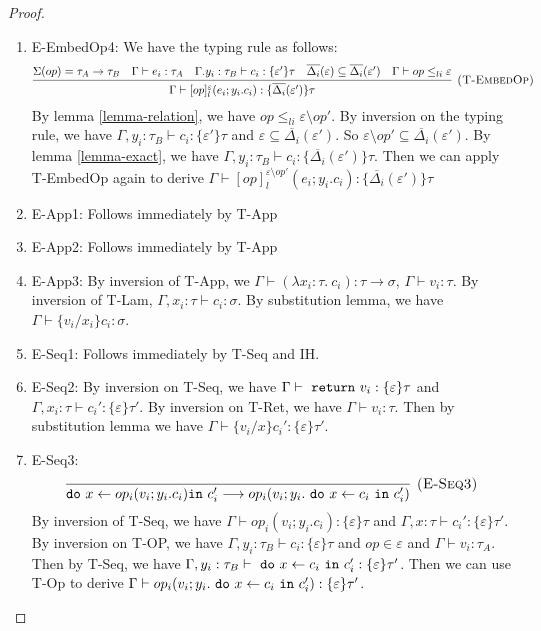 \begin{lemma}
\begin{proof}
\begin{enumerate}
\item E-EmbedOp4:
We have the typing rule as follows:
$$\infer[\textsc{(T-EmbedOp)}]
  {\Gamma\vdash [op]^\varepsilon_l(e_i; y_i.c_i) : \{\overline{\Delta_i}(\varepsilon')\}\tau }
  {\Sigma(op) = \tau_A \rightarrow \tau_B & \Gamma \vdash e_i : \tau_A & \Gamma. y_i:\tau_B\vdash c_i: \{\varepsilon'\}\tau & \overline{\Delta_i}(\varepsilon) \subseteq \overline{\Delta_i}(\varepsilon') & \Gamma \vdash op \leq_{li} \varepsilon}  $$
By lemma \ref{lemma-relation}, we have $op \leq_{li} \varepsilon \setminus op'$. By inversion on the typing rule, we have $\Gamma, y_i:\tau_B \vdash c_i:\{\varepsilon'\}\tau$ and $\varepsilon \subseteq \overline{\Delta_i}(\varepsilon')$.  So $\varepsilon \setminus op' \subseteq \overline{\Delta_i}(\varepsilon')$. By lemma \ref{lemma-exact}, we have $\Gamma, y_i:\tau_B \vdash c_i:\{\overline{\Delta_i}(\varepsilon')\}\tau$. Then we can apply T-EmbedOp again to derive $\Gamma\vdash [op]^{\varepsilon \setminus op'}_l(e_i; y_i.c_i) : \{\overline{\Delta_i}(\varepsilon')\}\tau $
  
\item E-App1: Follows immediately by T-App
\item E-App2: Follows immediately by T-App
\item E-App3: By inversion of T-App, we $\Gamma \vdash (\lambda x_i: \tau.\ c_i) : \tau \rightarrow \sigma$, $\Gamma \vdash v_i : \tau$. By inversion of T-Lam, $\Gamma, x_i:\tau \vdash c_i : \sigma$. By substitution lemma, we have $\Gamma \vdash \{v_i/x_i\}c_i : \sigma$.

\item E-Seq1:  Follows immediately by T-Seq and IH.
\item E-Seq2: By inversion on T-Seq, we have $\Gamma \vdash \ \texttt{return}\  v_i : \{\varepsilon\}\tau$ and $\Gamma, x_i:  \tau \vdash c_i': \{\varepsilon\}\tau'$. By inversion on T-Ret, we have $\Gamma \vdash v_i: \tau$. Then by substitution lemma we have $\Gamma \vdash \{v_i/x\}c_i' : \{\varepsilon\}\tau'$.
\item E-Seq3: 
$$
\infer[\textsc{(E-Seq3)}]
  {\texttt{do}\ x \leftarrow op_i(v_i; y_i.c_i) \texttt{in}\ c_i' \longrightarrow op_i(v_i; y_i. \m{do} x \leftarrow c_i \m{in} c_i')}
  {} $$
  By inversion of T-Seq, we have $\Gamma \vdash op_i(v_i; y_i.c_i) : \{\varepsilon\}\tau$  and $\Gamma , x:\tau \vdash c_i' : \{\varepsilon\}\tau'$. By inversion on T-OP, we have $\Gamma, y_i: \tau_B \vdash c_i: \{\varepsilon\}\tau$ and $op \in \varepsilon$ and $\Gamma \vdash v_i : \tau_A$.  Then by T-Seq, we have $\Gamma, y_i : \tau_B \vdash \ \texttt{do}\  x \leftarrow c_i \ \texttt{in}\  c_i' : \{\varepsilon\}\tau'$. Then we can use T-Op to derive $\Gamma \vdash op_i(v_i; y_i. \ \texttt{do}\  x \leftarrow c_i \ \texttt{in}\  c_i') : \{\varepsilon\}\tau'$.


\end{enumerate}
\end{proof}
\end{lemma}
